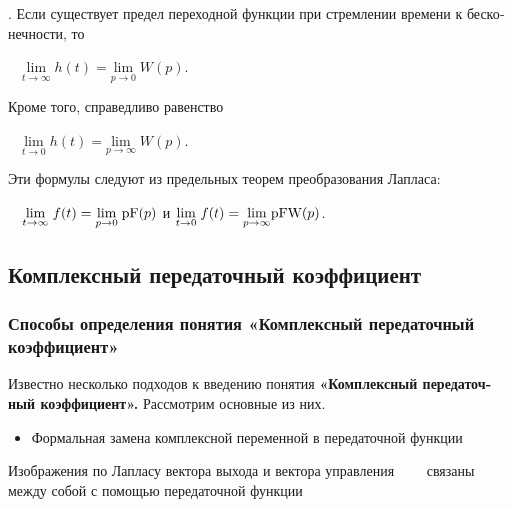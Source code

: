 \documentclass[a4paper]{article}
\newcommand\liststyleWWviiiNumlxxiv{%
\renewcommand\theenumi{\arabic{enumi}}
\renewcommand\theenumii{\arabic{enumii}}
\renewcommand\theenumiii{\arabic{enumiii}}
\renewcommand\labelitemi{}
\renewcommand\labelenumi{\theenumi.}
\renewcommand\labelenumii{\theenumii.}
\renewcommand\labelenumiii{\theenumiii.}
}
\newcommand\normalsubformula[1]{\text{\mathversion{normal}$#1$}}
\begin{document}
{\begin{russian}. Если существует предел переходной функции при стремлении времени к бесконечности, то
\end{russian}}

{\begin{russian}\sffamily
\ \  $\underset{t\rightarrow \infty }{\text{lim}}\;h(t)=\underset{p\rightarrow 0}{\text{lim}}\;W(p)$.
\end{russian}}

{\begin{russian}\sffamily
Кроме того, справедливо равенство
\end{russian}}

{\begin{russian}\sffamily
\ \  $\underset{t\rightarrow 0}{\text{lim}}\;h(t)=\underset{p\rightarrow \infty }{\text{lim}}\;W(p)$.
\end{russian}}

{\begin{russian}\sffamily
Эти формулы следуют из предельных теорем преобразования Лапласа:
\end{russian}}

{\begin{russian}\sffamily
\ \  $\underset{t\rightarrow \infty }{\text{lim}}\;f(t)=\underset{p\rightarrow
0}{\text{lim}}\;\normalsubformula{\text{pF}}(p)$ и  $\underset{t\rightarrow 0}{\text{lim}}\;f(t)=\underset{p\rightarrow
\infty }{\text{lim}}\normalsubformula{\text{pFW}}(p)$.
\end{russian}}

\clearpage\subsection{Комплексный передаточный коэффициент }
\hypertarget{RefHeadingToc455659711}{}\subsubsection{Способы определения понятия «Комплексный передаточный коэффициент»}
\hypertarget{RefHeadingToc455659712}{}
\bigskip

{\begin{russian}\sffamily
Известно несколько подходов к введению понятия \textbf{«Комплексный передаточный коэффициент». }Рассмотрим основные из
них.
\end{russian}}

\liststyleWWviiiNumlxxiv
\begin{itemize}
\item {\begin{russian}\sffamily
Формальная замена комплексной переменной в передаточной функции
\end{russian}}
\end{itemize}
{\begin{russian}\sffamily
Изображения по Лапласу вектора выхода и вектора управления \ \ \ \ связаны между собой с помощью передаточной функции
\end{russian}}
\end{document}
